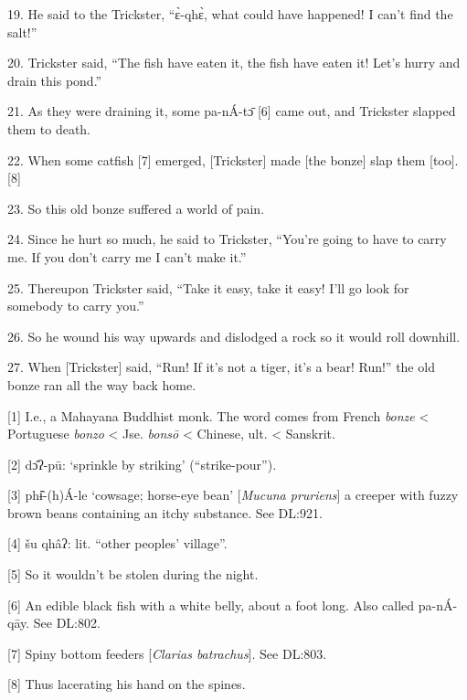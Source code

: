 {\LARGE{}19. He said to the Trickster, ``ɛ̀-qhɛ̀, what could have happened!
I can't find the salt!''}

{\LARGE{}20. Trickster said, ``The fish have eaten it, the fish have eaten it!
Let's hurry and drain this pond.''}

{\LARGE{}21. As they were draining it, some pa-nÁ-tɔ̄ [6] came out, and Trickster
slapped them to death.}

{\LARGE{}22. When some catfish [7] emerged, [Trickster] made [the bonze] slap them
[too]. [8]}

{\LARGE{}23. So this old bonze suffered a world of pain.}

{\LARGE{}24. Since he hurt so much, he said to Trickster, ``You're going to have
to carry me.  If you don't carry me I can't make it.''}

{\LARGE{}25. Thereupon Trickster said, ``Take it easy, take it easy! I'll go look
for somebody to carry you.''}

{\LARGE{}26. So he wound his way upwards and dislodged a rock so it would roll
downhill.}

{\LARGE{}27. When [Trickster] said, ``Run! If it's not a tiger, it's a bear! Run!''
the old bonze ran all the way back home.}

{\LARGE{}[1] I.e., a Mahayana Buddhist monk. The word comes from French }{\LARGE{}\textit{bonze}}{\LARGE{}
< Portuguese }{\LARGE{}\textit{bonzo}}{\LARGE{} < Jse. }{\LARGE{}\textit{bonsō}}{\LARGE{}
< Chinese, ult. < Sanskrit.}

{\LARGE{}[2] dɔ̂ʔ-pū: `sprinkle by striking' (``strike-pour'').}

{\LARGE{}[3] phɨ̂-(h)Á-le `cowsage; horse-eye bean' [}{\LARGE{}\textit{Mucuna
pruriens}}{\LARGE{}] a creeper with fuzzy brown beans containing an itchy substance.
See DL:921.}

{\LARGE{}[4] šu qhâʔ: lit. ``other peoples' village''.}

{\LARGE{}[5] So it wouldn't be stolen during the night.}

{\LARGE{}[6] An edible black fish with a white belly, about a foot long. Also called
pa-nÁ-qāy. See DL:802.}

{\LARGE{}[7] Spiny bottom feeders [}{\LARGE{}\textit{Clarias batrachus}}{\LARGE{}].
See DL:803.}

{\LARGE{}[8] Thus lacerating his hand on the spines.}


